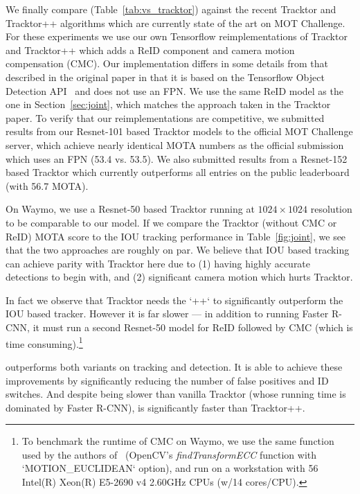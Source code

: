 We finally compare (Table~\ref{tab:vs_tracktor}) 
against the recent Tracktor and Tracktor++ algorithms
which are currently state of the art on MOT Challenge. 
For these experiments we use our own Tensorflow reimplementations
of Tracktor and Tracktor++ which adds a ReID component and 
camera motion compensation (CMC). 
Our implementation differs in some details
from that described in the original paper in that it is based on the
Tensorflow Object Detection API~\cite{huang2017speed}
and does not use an FPN.  
We use the same ReID model as the one in Section~\ref{sec:joint}, 
which matches the approach taken in the Tracktor paper.
To verify that our reimplementations are
competitive, we submitted results
from our Resnet-101
based Tracktor models to the official MOT Challenge server, which 
achieve nearly identical MOTA numbers as the official submission which 
uses an FPN (53.4 vs. 53.5).  We also submitted results from
a Resnet-152 based Tracktor which currently outperforms all 
entries on the public leaderboard (with 56.7 MOTA).  

On  Waymo, we use a  Resnet-50 based Tracktor  running at 
$1024\times 1024$ resolution to be comparable to our model.
If we compare the  Tracktor (without
CMC or ReID) MOTA score to the IOU tracking performance in Table~\ref{fig:joint},
we see that the two approaches are roughly on par.  We believe that IOU based tracking can achieve parity with 
Tracktor here due to (1) having highly accurate detections to begin with,
and (2) significant camera motion which hurts  Tracktor.

In fact we observe that
Tracktor needs the `++` to significantly outperform the IOU based tracker.
However it is far slower --- in addition to running
Faster R-CNN, it must run a second Resnet-50 model for ReID
followed by CMC (which is time consuming).\footnote{
To benchmark the runtime of CMC on Waymo, we use the same function used
by the authors of~\cite{bergmann2019tracking} 
(OpenCV's \emph{findTransformECC} function with `MOTION\_EUCLIDEAN` option),
and run on a workstation with 56 Intel(R) Xeon(R)  E5-2690 v4 2.60GHz CPUs (w/14 cores/CPU).
}

\modelname outperforms both variants on tracking and detection. It 
is able to achieve these improvements by significantly reducing the number of
false positives and ID switches.  And despite being slower than  vanilla
Tracktor  (whose running time is dominated by Faster R-CNN), \modelname is 
significantly faster than Tracktor++.


